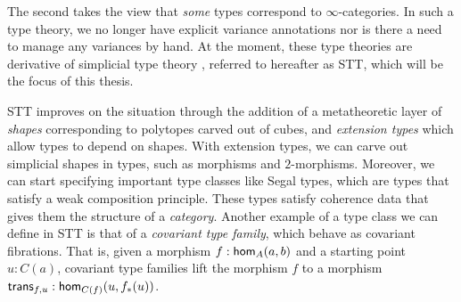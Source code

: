 \documentclass[main.tex]{subfiles}
\begin{document}
The second takes the view that \textit{some} types correspond to $\infty$-categories. In such a type theory, we no longer have explicit variance annotations nor is there a need to manage any variances by hand. At the moment, these type theories are derivative of simplicial type theory \cite{riehl_type_2017}, referred to hereafter as STT, which will be the focus of this thesis. 

STT improves on the situation through the addition of a metatheoretic layer of \textit{shapes} corresponding to polytopes carved out of cubes, and \textit{extension types} which allow types to depend on shapes. With extension types, we can carve out simplicial shapes in types, such as morphisms and $2$-morphisms. Moreover, we can start specifying important type classes like Segal types, which are types that satisfy a weak composition principle. These types satisfy coherence data that gives them the structure of a \textit{category}. Another example of a type class we can define in STT is that of a \textit{covariant type family}, which behave as covariant fibrations. That is, given a morphism $f : \ho[A]{a}{b}$ and a starting point $u : C(a)$, covariant type families lift the morphism $f$ to a morphism $\trans{f}{u}:\ho[C(f)]{u}{f_*(u)}$. 
\end{document}
